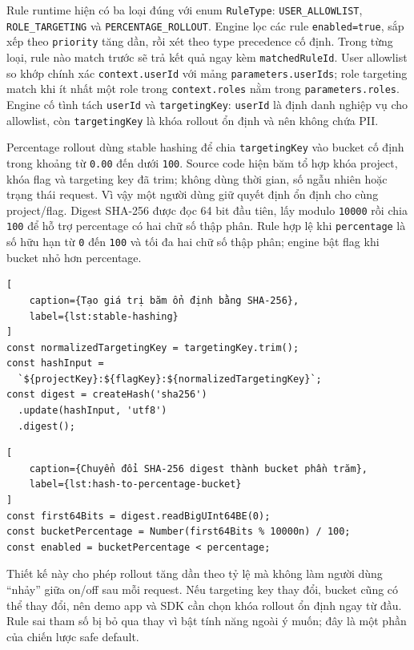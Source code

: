 Rule runtime hiện có ba loại đúng với enum \texttt{RuleType}: \texttt{USER\_ALLOWLIST}, \texttt{ROLE\_TARGETING} và \texttt{PERCENTAGE\_ROLLOUT}. Engine lọc các rule \texttt{enabled=true}, sắp xếp theo \texttt{priority} tăng dần, rồi xét theo type precedence cố định. Trong từng loại, rule nào match trước sẽ trả kết quả ngay kèm \texttt{matchedRuleId}. User allowlist so khớp chính xác \texttt{context.userId} với mảng \texttt{parameters.userIds}; role targeting match khi ít nhất một role trong \texttt{context.roles} nằm trong \texttt{parameters.roles}. Engine cố tình tách \texttt{userId} và \texttt{targetingKey}: \texttt{userId} là định danh nghiệp vụ cho allowlist, còn \texttt{targetingKey} là khóa rollout ổn định và nên không chứa PII.

Percentage rollout dùng stable hashing để chia \texttt{targetingKey} vào bucket cố định trong khoảng từ \texttt{0.00} đến dưới \texttt{100}. Source code hiện băm tổ hợp khóa project, khóa flag và targeting key đã trim; không dùng thời gian, số ngẫu nhiên hoặc trạng thái request. Vì vậy một người dùng giữ quyết định ổn định cho cùng project/flag. Digest SHA-256 được đọc 64 bit đầu tiên, lấy modulo \texttt{10000} rồi chia \texttt{100} để hỗ trợ percentage có hai chữ số thập phân. Rule hợp lệ khi \texttt{percentage} là số hữu hạn từ \texttt{0} đến \texttt{100} và tối đa hai chữ số thập phân; engine bật flag khi bucket nhỏ hơn percentage.

\begin{lstlisting}[
    caption={Tạo giá trị băm ổn định bằng SHA-256},
    label={lst:stable-hashing}
]
const normalizedTargetingKey = targetingKey.trim();
const hashInput =
  `${projectKey}:${flagKey}:${normalizedTargetingKey}`;
const digest = createHash('sha256')
  .update(hashInput, 'utf8')
  .digest();
\end{lstlisting}

\begin{lstlisting}[
    caption={Chuyển đổi SHA-256 digest thành bucket phần trăm},
    label={lst:hash-to-percentage-bucket}
]
const first64Bits = digest.readBigUInt64BE(0);
const bucketPercentage = Number(first64Bits % 10000n) / 100;
const enabled = bucketPercentage < percentage;
\end{lstlisting}

Thiết kế này cho phép rollout tăng dần theo tỷ lệ mà không làm người dùng ``nhảy'' giữa on/off sau mỗi request. Nếu targeting key thay đổi, bucket cũng có thể thay đổi, nên demo app và SDK cần chọn khóa rollout ổn định ngay từ đầu. Rule sai tham số bị bỏ qua thay vì bật tính năng ngoài ý muốn; đây là một phần của chiến lược safe default.


